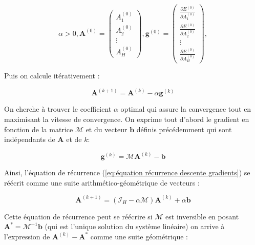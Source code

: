 \documentclass[12pt]{report}
\begin{document}
\begin{equation}
    \alpha>0, 
    \bm{A}^{(0)} = \begin{pmatrix}
                A_1^{(0)} \\
                A_2^{(0)} \\
                \vdots \\
                A_H^{(0)}
              \end{pmatrix},
    \bm{g}^{(0)} = \begin{pmatrix}
                \frac{\partial E^{(0)}}{\partial A_1^{(0)}} \\
                \frac{\partial E^{(0)}}{\partial A_2^{(0)}} \\
                \vdots \\
                \frac{\partial E^{(0)}}{\partial A_H^{(0)}}
              \end{pmatrix},     
\label{eq:définition descente de gradients}
\end{equation}

Puis on calcule itérativement :

\begin{equation}
    \bm{A}^{(k+1)} = \bm{A}^{(k)} - \alpha\bm{g}^{(k)} 
\label{eq:équation récurrence descente gradients}
\end{equation}

On cherche à trouver le coefficient $\alpha$ optimal qui assure la convergence tout en maximisant la vitesse de convergence.
On exprime tout d'abord le gradient en fonction de la matrice $\mathcal{M}$ et du vecteur $\bm{b}$ définis précédemment qui sont indépendants de $\bm{A}$ et de $k$:

\begin{equation}
    \bm{g}^{(k)} = \mathcal{M}\bm{A}^{(k)} - \bm{b}
\label{eq:expression matricielle gradient}
\end{equation}

Ainsi, l'équation de récurrence (\ref{eq:équation récurrence descente gradients}) se réécrit comme une suite arithmético-géométrique de vecteurs :

\begin{equation}
    \bm{A}^{(k+1)} = (\mathcal{I}_H - \alpha \mathcal{M} )  \bm{A}^{(k)} + \alpha\bm{b}
\label{eq:équation récurrence descente gradients v2}
\end{equation}

Cette équation de récurrence peut se réécrire si $\mathcal M$ est inversible en posant $\bm{A^*} = \mathcal {M}^{-1}\bm{b}$ (qui est l'unique solution du système linéaire) on arrive à l'expression de $\bm{A}^{(k)}-\bm{A^*} $ comme une suite géométrique :
\end{document}
